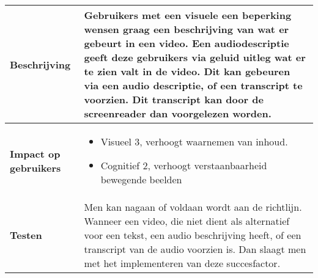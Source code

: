\begin{table}[H]
\begin{tabular}{|l|p{12cm}|}
        \hline
        \textbf{Beschrijving}                & Gebruikers met een visuele een beperking wensen graag een beschrijving van wat er gebeurt in een video. Een audiodescriptie geeft deze gebruikers via geluid uitleg wat er te zien valt in de video. Dit kan gebeuren via een audio descriptie, of een transcript te voorzien. Dit transcript kan door de screenreader dan voorgelezen worden.\\ 
        \hline
        \textbf{Impact op gebruikers}        & 
        \begin{itemize}
            \item Visueel 3, verhoogt waarnemen van inhoud.    
            \item Cognitief 2, verhoogt verstaanbaarheid bewegende beelden         
        \end{itemize}                                                                                                                   \\ 
      
        \hline
        \textbf{Testen}                      & Men kan nagaan of voldaan wordt aan de richtlijn. Wanneer een video, die niet dient als alternatief voor een tekst, een audio beschrijving heeft, of een transcript van de audio voorzien is. Dan slaagt men met het implementeren van deze succesfactor.                                                                                                                               \\
        \hline
    \end{tabular}
\end{table}

